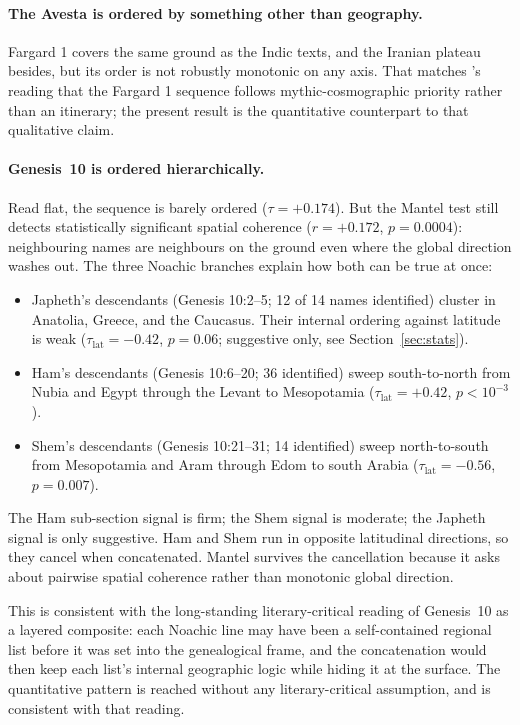 \documentclass[11pt]{article}
\begin{document}
\paragraph{The Avesta is ordered by something other than geography.}
Fargard 1 covers the same ground as the Indic texts, and the
Iranian plateau besides, but its order is not robustly monotonic on
any axis.
That matches \citet{gnoli1980}'s reading that the Fargard 1
sequence follows mythic-cosmographic priority rather than an
itinerary; the present result is the quantitative counterpart to
that qualitative claim.

\paragraph{Genesis~10 is ordered hierarchically.}
Read flat, the sequence is barely ordered ($\tau = +0.174$). But the
Mantel test still detects statistically significant spatial
coherence ($r = +0.172$, $p = 0.0004$): neighbouring names are
neighbours on the ground even where the global direction washes out. The three Noachic branches
explain how both can be true at once:

\begin{itemize}
\item Japheth's descendants (Genesis 10:2--5; 12 of 14 names
      identified) cluster in Anatolia, Greece, and the Caucasus.
      Their internal ordering against latitude is weak
      ($\tau_\text{lat} = -0.42$, $p = 0.06$; suggestive only,
      see Section~\ref{sec:stats}).
\item Ham's descendants (Genesis 10:6--20; 36 identified) sweep
      south-to-north from Nubia and Egypt through the Levant to
      Mesopotamia ($\tau_\text{lat} = +0.42$, $p < 10^{-3}$).
\item Shem's descendants (Genesis 10:21--31; 14 identified) sweep
      north-to-south from Mesopotamia and Aram through Edom to
      south Arabia ($\tau_\text{lat} = -0.56$, $p = 0.007$).
\end{itemize}

The Ham sub-section signal is firm; the Shem signal is moderate; the
Japheth signal is only suggestive. Ham and Shem run in opposite
latitudinal directions, so they cancel when concatenated. Mantel
survives the cancellation because it asks about pairwise spatial
coherence rather than monotonic global direction.

This is consistent with the long-standing literary-critical reading
\citep[e.g.,][]{westermann1984} of Genesis~10 as a layered
composite: each Noachic line may have been a self-contained
regional list before it was set into the genealogical frame, and
the concatenation would then keep each list's internal geographic
logic while hiding it at the surface. The quantitative pattern is
reached without any literary-critical assumption, and is consistent
with that reading.
\end{document}
